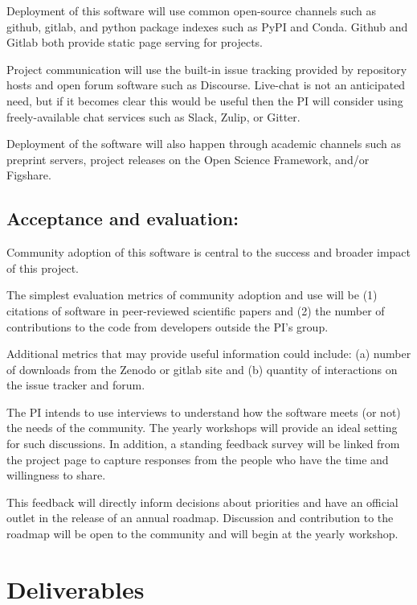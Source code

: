 Deployment of this software will use common open-source channels such as github, gitlab, and python package indexes such as PyPI and Conda.  Github and Gitlab both provide static page serving for projects.

Project communication will use the built-in issue tracking provided by repository hosts and open forum software such as Discourse.  Live-chat is not an anticipated need, but if it becomes clear this would be useful then the PI will consider using freely-available chat services such as Slack, Zulip, or Gitter.

Deployment of the software will also happen through academic channels such as preprint servers, project releases on the Open Science Framework, and/or Figshare.



\subsection{Acceptance and evaluation:}

Community adoption of this software is central to the success and broader impact of this project.

The simplest evaluation metrics of community adoption and use will be (1) citations of software in peer-reviewed scientific papers and (2) the number of contributions to the code from developers outside the PI's group.

Additional metrics that may provide useful information could include: (a) number of downloads from the Zenodo or gitlab site and (b) quantity of interactions on the issue tracker and forum.

The PI intends to use interviews to understand how the software meets (or not) the needs of the community.  The yearly workshops will provide an ideal setting for such discussions.  In addition, a standing feedback survey will be linked from the project page to capture responses from the people who have the time and willingness to share.

This feedback will directly inform decisions about priorities and have an official outlet in the release of an annual roadmap.  Discussion and contribution to the roadmap will be open to the community and will begin at the yearly workshop.


\section{Deliverables}

